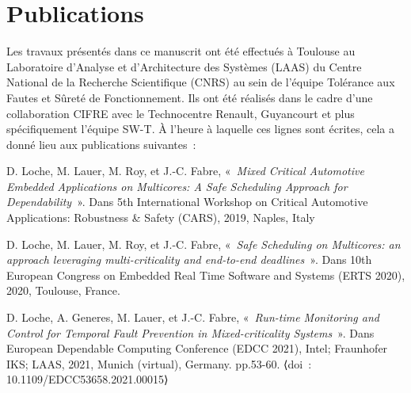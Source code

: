 \documentclass[french, a4paper, 11pt, twoside, pdftex]{StyleThese}
\begin{document}






%






\begingroup\raggedright

\endgroup

\chapter*{Publications}
Les travaux présentés dans ce manuscrit ont été effectués à Toulouse au Laboratoire d’Analyse et d’Architecture des Systèmes (LAAS) du Centre National de la Recherche Scientifique (CNRS) au sein de l'équipe Tolérance aux Fautes et Sûreté de Fonctionnement. Ils ont été réalisés dans le cadre d'une collaboration CIFRE avec le Technocentre Renault, Guyancourt et plus spécifiquement l'équipe SW-T. À l'heure à laquelle ces lignes sont écrites, cela a donné lieu aux publications suivantes~:

\begingroup\raggedright
\begin{description}
	\item	D. Loche, M. Lauer, M. Roy, et J.-C. Fabre, « \textit{Mixed Critical Automotive Embedded Applications on Multicores: A Safe Scheduling Approach for Dependability} ». Dans 5th International Workshop on Critical Automotive Applications: Robustness \& Safety (CARS), 2019, Naples, Italy 
	\smallbreak
	\item	D. Loche, M. Lauer, M. Roy, et J.-C. Fabre, « \textit{Safe Scheduling on Multicores: an approach leveraging multi-criticality and end-to-end deadlines} ». Dans 10th European Congress on Embedded Real Time Software and Systems (ERTS 2020), 2020, Toulouse, France.
	\smallbreak	
	\item	D. Loche, A. Generes, M. Lauer, et J.-C. Fabre, « \textit{Run-time Monitoring and Control for Temporal Fault Prevention in Mixed-criticality Systems} ». Dans European Dependable Computing Conference (EDCC 2021), Intel; Fraunhofer IKS; LAAS, 2021, Munich (virtual), Germany. pp.53-60. ⟨doi~: 10.1109/EDCC53658.2021.00015⟩	
\end{description}
\endgroup
\vspace*{\fill}
\end{document}
